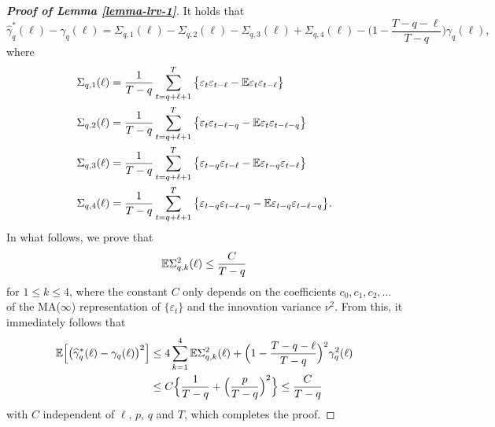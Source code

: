 \begin{proof}[\textnormal{\textbf{Proof of Lemma \ref{lemma-lrv-1}}}] 
It holds that
\[ \widehat{\gamma}_q^*(\ell) - \gamma_q(\ell) = \Sigma_{q,1}(\ell) - \Sigma_{q,2}(\ell) - \Sigma_{q,3}(\ell) + \Sigma_{q,4}(\ell) - \Big(1 - \frac{T-q-\ell}{T-q}\Big) \gamma_q(\ell), \]
where
\begin{align*}
\Sigma_{q,1}(\ell) & = \frac{1}{T-q} \sum_{t=q+\ell+1}^T \big\{ \varepsilon_t \varepsilon_{t-\ell} - \mathbb{E} \varepsilon_t \varepsilon_{t-\ell} \big\} \\
\Sigma_{q,2}(\ell) & = \frac{1}{T-q} \sum_{t=q+\ell+1}^T \big\{ \varepsilon_t \varepsilon_{t-\ell-q} - \mathbb{E} \varepsilon_t \varepsilon_{t-\ell-q} \big\} \\
\Sigma_{q,3}(\ell) & = \frac{1}{T-q} \sum_{t=q+\ell+1}^T \big\{ \varepsilon_{t-q} \varepsilon_{t-\ell} - \mathbb{E} \varepsilon_{t-q} \varepsilon_{t-\ell} \big\} \\
\Sigma_{q,4}(\ell) & = \frac{1}{T-q} \sum_{t=q+\ell+1}^T \big\{ \varepsilon_{t-q} \varepsilon_{t-\ell-q} - \mathbb{E} \varepsilon_{t-q} \varepsilon_{t-\ell-q} \big\}. 
\end{align*}
In what follows, we prove that 
\begin{equation}\label{eq1-lemma-lrv-1}
\mathbb{E} \Sigma_{q,k}^2(\ell) \le \frac{C}{T-q} 
\end{equation}
for $1 \le k \le 4$, where the constant $C$ only depends on the coefficients $c_0,c_1,c_2,\ldots$ of the MA($\infty$) representation of $\{\varepsilon_t\}$ and the innovation variance $\nu^2$. From this, it immediately follows that 
\begin{align*}
\mathbb{E} \Big[ \big( \widehat{\gamma}_q^*(\ell) - \gamma_q(\ell) \big)^2 \Big] 
 & \le 4 \sum_{k=1}^4 \mathbb{E} \Sigma_{q,k}^2(\ell) + \Big(1 - \frac{T-q-\ell}{T-q}\Big)^2 \gamma_q^2(\ell) \\
 & \le C \Big\{ \frac{1}{T-q} + \Big(\frac{p}{T-q}\Big)^2 \Big\} \le \frac{C}{T-q}  
\end{align*}
with $C$ independent of $\ell$, $p$, $q$ and $T$, which completes the proof. 



\end{proof}
